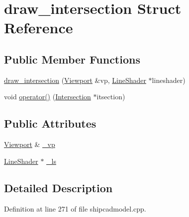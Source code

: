 \hypertarget{structdraw__intersection}{\section{draw\-\_\-intersection Struct Reference}
\label{structdraw__intersection}
}
\subsection*{Public Member Functions}
\begin{DoxyCompactItemize}
\item 
\hyperlink{structdraw__intersection_a4471bc736f3a58dc15f577144772601b}{draw\-\_\-intersection} (\hyperlink{classShipCAD_1_1Viewport}{Viewport} \&vp, \hyperlink{classShipCAD_1_1LineShader}{Line\-Shader} $\ast$lineshader)
\item 
void \hyperlink{structdraw__intersection_a3515516eb4ac321e9a1323140b9f47b0}{operator()} (\hyperlink{classShipCAD_1_1Intersection}{Intersection} $\ast$itsection)
\end{DoxyCompactItemize}
\subsection*{Public Attributes}
\begin{DoxyCompactItemize}
\item 
\hyperlink{classShipCAD_1_1Viewport}{Viewport} \& \hyperlink{structdraw__intersection_a4550bf7c1203e48abdc041e4e248c5f7}{\-\_\-vp}
\item 
\hyperlink{classShipCAD_1_1LineShader}{Line\-Shader} $\ast$ \hyperlink{structdraw__intersection_a5f59d55f5e41a2585af4fea6a4d93374}{\-\_\-ls}
\end{DoxyCompactItemize}


\subsection{Detailed Description}


Definition at line 271 of file shipcadmodel.\-cpp.



